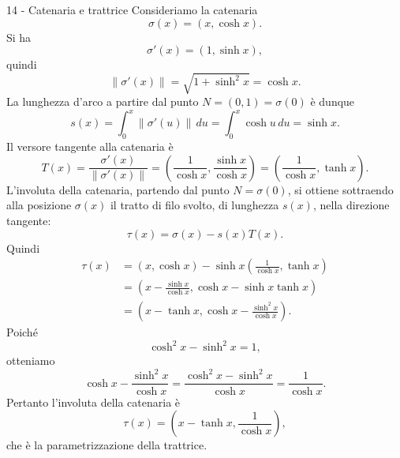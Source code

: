 \documentclass[a4paper]{article}
\begin{document}
\begin{snippetsolution}{14 - Catenaria e trattrice}
    Consideriamo la catenaria
    \[
        \sigma(x)=(x,\cosh x).
    \]
    Si ha
    \[
        \sigma'(x)=(1,\sinh x),
    \]
    quindi
    \[
        \left\|\sigma'(x)\right\|
        =
        \sqrt{1+\sinh^2x}
        =
        \cosh x.
    \]
    La lunghezza d'arco a partire dal punto \(N=(0,1)=\sigma(0)\) è dunque
    \[
        s(x)=\int_0^x \left\|\sigma'(u)\right\|\,du
        =
        \int_0^x \cosh u\,du
        =
        \sinh x.
    \]
    Il versore tangente alla catenaria è
    \[
        T(x)=\frac{\sigma'(x)}{\left\|\sigma'(x)\right\|}
        =
        \left(
            \frac{1}{\cosh x},
            \frac{\sinh x}{\cosh x}
        \right)
        =
        \left(
            \frac{1}{\cosh x},
            \tanh x
        \right).
    \]
    L'involuta della catenaria, partendo dal punto \(N=\sigma(0)\), si ottiene sottraendo alla posizione \(\sigma(x)\) il tratto di filo svolto, di lunghezza \(s(x)\), nella direzione tangente:
    \[
        \tau(x)=\sigma(x)-s(x)T(x).
    \]
    Quindi
    \begin{align*}
        \tau(x)
        &=
        (x,\cosh x)
        -
        \sinh x
        \left(
            \frac{1}{\cosh x},
            \tanh x
        \right)\\
        &=
        \left(
            x-\frac{\sinh x}{\cosh x},
            \cosh x-\sinh x\tanh x
        \right)\\
        &=
        \left(
            x-\tanh x,
            \cosh x-\frac{\sinh^2x}{\cosh x}
        \right).
    \end{align*}
    Poiché
    \[
        \cosh^2x-\sinh^2x=1,
    \]
    otteniamo
    \[
        \cosh x-\frac{\sinh^2x}{\cosh x}
        =
        \frac{\cosh^2x-\sinh^2x}{\cosh x}
        =
        \frac{1}{\cosh x}.
    \]
    Pertanto l'involuta della catenaria è
    \[
        \tau(x)=
        \left(
            x-\tanh x,
            \frac{1}{\cosh x}
        \right),
    \]
    che è la parametrizzazione della trattrice.
\end{snippetsolution}
\end{document}
